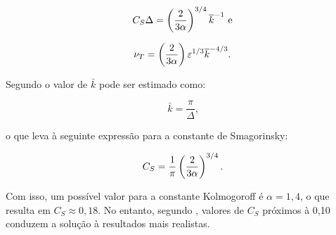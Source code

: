 \begin{equation}
    C_S\Delta=\left({\frac{2}{3\alpha}}\right)^{3/4}\overline{k}^{-1}\text{ e}
\end{equation}

\begin{equation}
    \nu_T=\left({\frac{2}{3\alpha}}\right)\varepsilon^{1/3}\overline{k}^{-4/3}\text{.}
\end{equation}

Segundo  o valor de $\bar{k}$ pode ser estimado como:

\begin{equation}
    \bar{k}=\frac{\pi}{\Delta}\text{,}
\end{equation}

\noindent o que leva à seguinte expressão para a constante de Smagorinsky:

\begin{equation}
    C_S=\frac{1}{\pi}\left({\frac{2}{3\alpha}}\right)^{3/4}\text{.}
\end{equation}

Com isso, um possível valor para a constante Kolmogoroff é $\alpha=1,4$, o que resulta em $C_S\approx0,18$. No entanto, segundo  , valores de $C_S$ próximos à 0,10 conduzem a solução à resultados mais realistas.

